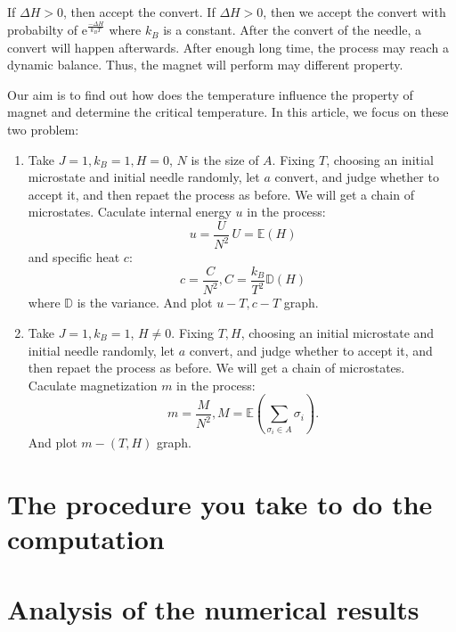 \documentclass[11pt,openany]{book}              %
\begin{document}
If \(\Delta H>0\), then accept the convert. If \(\Delta H > 0 \), then we accept the convert with
probabilty of \(\mathrm{e}^{\frac{- \Delta H}{k_BT}}\) where \(k_{B}\) is a constant.
After the convert of the needle, a convert will happen afterwards. After enough long time,
the process may reach a dynamic balance. Thus, the magnet will perform may different property.

Our aim is to find out how does the temperature influence the property of magnet and determine 
the critical temperature. In this article, we focus on these two problem:
\begin{enumerate}
  
  \item Take \(J=1, k_B=1, H=0\), \(N\) is the size of \(A\). Fixing \(T\), 
    choosing an initial microstate and initial needle randomly, 
    let \(a\) convert, and judge whether to accept it, and then repaet the process as before.
    We will get a chain of microstates.
    Caculate internal energy \(u\) in the process:
    \begin{equation}
    \, u=\frac{U}{N^2}    \, U=\mathbb{E}(H)
    \end{equation}
    and specific heat \(c\):
    \begin{equation}
    \, c=\frac{C}{N^2}, C=\frac{k_B}{T^2} \mathbb{D}(H)
    \end{equation}
    where \(\mathbb{D}\) is the variance.
    And plot \(u-T, c-T\) graph.
  \item Take \(J=1, k_B=1\), \(H \neq 0\). Fixing \(T, H\), 
    choosing an initial microstate and initial needle randomly, 
    let \(a\) convert, and judge whether to accept it, and then repaet the process as before.
    We will get a chain of microstates.
    Caculate magnetization \(m\) in the process:
    \begin{equation}
    \, m=\frac{M}{N^2}, M=\mathbb{E}(\sum_{\sigma_i \in A} \sigma_i ).
    \end{equation}
    And plot \(m-(T, H)\) graph.
\end{enumerate}



\section{The procedure you take to do the computation }





\section{Analysis of the numerical results }
\end{document}
